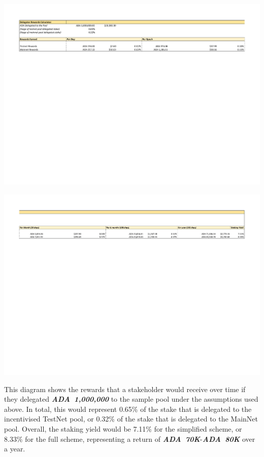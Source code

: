 \documentclass[11pt,a4paper,dvipsnames,twosided,final]{article}
\newcommand{\ada}{ADA{}}
\newcommand{\ADA}[1]{\textbf{\emph{\ada~{#1}}}}
\begin{document}
\hspace{-0.65in}\begin{minipage}{\textwidth}
  \includegraphics[width=1.2\textwidth]{RCM6.pdf}

\vspace{-3.8in}
\includegraphics[width=1.2\textwidth]{RCM7.pdf}

  \vspace{-3in}
\end{minipage}

\noindent
This diagram shows the rewards that a stakeholder would receive over time if they delegated \ADA{1,000,000} to
the sample pool under the assumptions used above.  In total, this would represent 0.65\% of the stake
that is delegated to the incentivised TestNet pool, or 0.32\% of the stake that is delegated to the MainNet pool.
Overall, the staking yield would be 7.11\% for the simplified scheme, or 8.33\% for the full scheme, representing
a return of \ADA{70K}-\ADA{80K} over a year.
\end{document}
